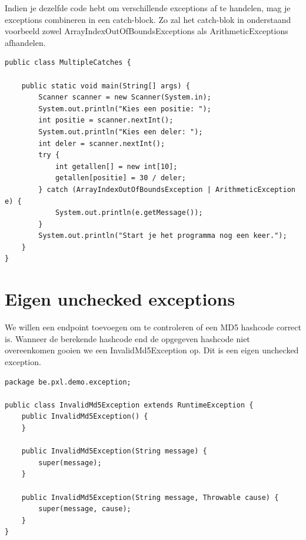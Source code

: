 Indien je dezelfde code hebt om verschillende exceptions af te handelen, mag je exceptions combineren in een catch-block. Zo zal het catch-blok in onderstaand voorbeeld zowel ArrayIndexOutOfBoundsExceptions als ArithmeticExceptions afhandelen.

\begin{lstlisting}
public class MultipleCatches {

	public static void main(String[] args) {
		Scanner scanner = new Scanner(System.in);
		System.out.println("Kies een positie: ");
		int positie = scanner.nextInt();
		System.out.println("Kies een deler: ");
		int deler = scanner.nextInt();
		try {
			int getallen[] = new int[10];
			getallen[positie] = 30 / deler;
		} catch (ArrayIndexOutOfBoundsException | ArithmeticException e) {
			System.out.println(e.getMessage());
		}
		System.out.println("Start je het programma nog een keer.");
	}
}
\end{lstlisting}

\section{Eigen unchecked exceptions}

We willen een endpoint toevoegen om te controleren of een MD5 hashcode correct is. 
Wanneer de berekende hashcode end de opgegeven hashcode niet overeenkomen gooien we een InvalidMd5Exception op.  Dit is een eigen unchecked exception. 

\begin{lstlisting}
package be.pxl.demo.exception;

public class InvalidMd5Exception extends RuntimeException {
	public InvalidMd5Exception() {
	}

	public InvalidMd5Exception(String message) {
		super(message);
	}

	public InvalidMd5Exception(String message, Throwable cause) {
		super(message, cause);
	}
}
\end{lstlisting}


